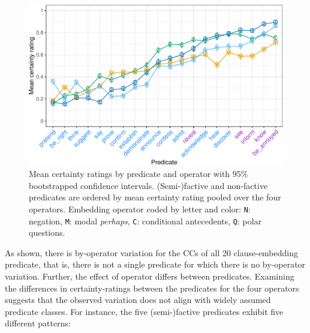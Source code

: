 \documentclass[a4paper,12pt,twoside]{article}
\begin{document}
    \begin{figure}[ht]
        \centering
		\includegraphics[width = \linewidth]{predicate-operator-graph-1}
		\caption{Mean certainty ratings by predicate and operator with 95\% bootstrapped confidence intervals. \textcolor{pred-fcv-color}{(Semi-)factive} and non-factive predicates are ordered by mean certainty rating pooled over the four operators.
        Embedding operator coded by letter and color:  \textcolor{op-n-color}{\texttt{N}: negation}, \textcolor{op-m-color}{\texttt{M}: modal \emph{perhaps}}, \textcolor{op-c-color}{\texttt{C}: conditional antecedents}, \textcolor{op-q-color}{\texttt{Q}: polar questions}.}
		\label{fig:op-pred-ratings}
	\end{figure}

    As shown, there is by-operator variation for the CCs of all 20 clause-embedding predicate, that is, there is not a single predicate for which there is no by-operator variation. Further, the effect of operator differs between predicates. Examining the differences in certainty-ratings between the predicates for the four operators suggests that the observed variation does not align with widely assumed predicate classes. For instance, the five (semi-)factive predicates exhibit five different patterns:
    
\end{document}

